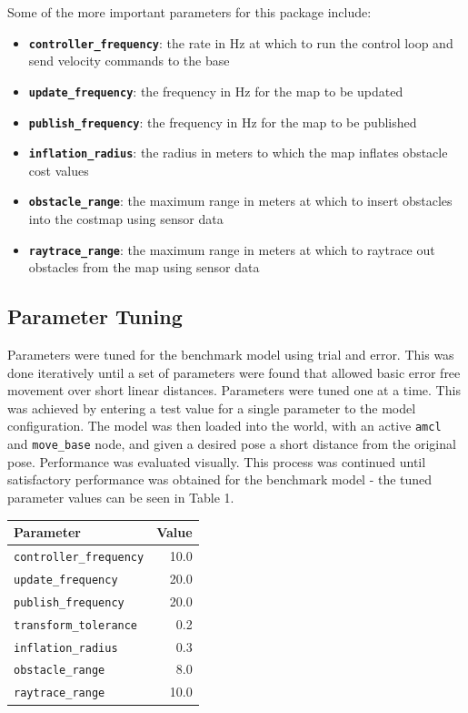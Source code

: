 \documentclass[a4paper]{article}
\begin{document}
Some of the more important parameters for this package include:
\begin{itemize}
\item \textbf{\texttt{controller\_frequency}}: the rate in $\si{\hertz}$ at which to run the control loop and send velocity commands to the base
\item \textbf{\texttt{update\_frequency}}: the frequency in $\si{\hertz}$ for the map to be updated
\item \textbf{\texttt{publish\_frequency}}: the frequency in $\si{\hertz}$ for the map to be published
\item \textbf{\texttt{inflation\_radius}}: the radius in meters to which the map inflates obstacle cost values
\item \textbf{\texttt{obstacle\_range}}: the maximum range in meters at which to insert obstacles into the costmap using sensor data
\item \textbf{\texttt{raytrace\_range}}: the maximum range in meters at which to raytrace out obstacles from the map using sensor data
\end{itemize}

\subsection{Parameter Tuning}
\begin{minipage}{0.55\textwidth}
Parameters were tuned for the benchmark model using trial and error. This was done iteratively until a set of parameters were found that allowed basic error free movement over short linear distances. Parameters were tuned one at a time. This was achieved by entering a test value for a single parameter to the model configuration. The model was then loaded into the world, with an active \texttt{amcl} and \texttt{move\_base} node, and given a desired pose a short distance from the original pose. Performance was evaluated visually. This process was continued until satisfactory performance was obtained for the benchmark model - the tuned parameter values can be seen in Table 1.
\end{minipage}
\hspace{0.75cm}
\begin{minipage}{0.35\textwidth}
\centering
{}
\begin{tabular}{lr}
\toprule
\textbf{Parameter} & \textbf{Value}\\
\midrule
\texttt{controller\_frequency} & 10.0 \\
\texttt{update\_frequency} & 20.0 \\
\texttt{publish\_frequency} & 20.0 \\
\texttt{transform\_tolerance} & 0.2 \\
\texttt{inflation\_radius} & 0.3 \\
\texttt{obstacle\_range} & 8.0\\
\texttt{raytrace\_range} & 10.0\\
\bottomrule
\end{tabular}
\end{minipage}
\end{document}
